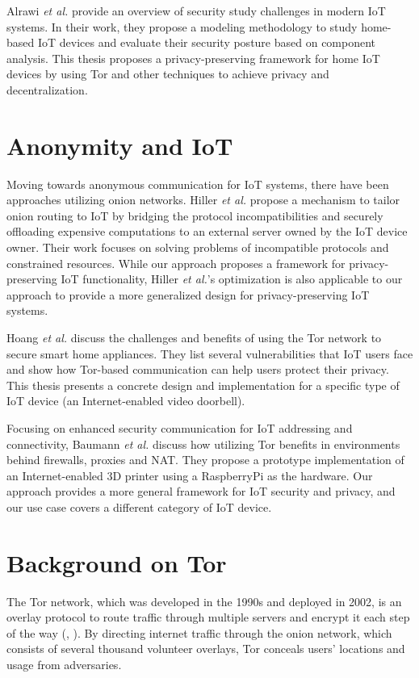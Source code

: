 Alrawi \textit{et al.} \cite{alrawi2019sok} provide an overview of security study challenges in modern IoT systems. In their work, they propose a modeling methodology to study home-based IoT devices and evaluate their security posture based on component analysis. This thesis proposes a privacy-preserving framework for home IoT devices by using Tor and other techniques to achieve privacy and decentralization. 



\section{Anonymity and IoT}

Moving towards anonymous communication for IoT systems, there have been approaches utilizing onion networks. Hiller \textit{et al.} \cite{hiller2019tailoring} propose a mechanism to tailor onion routing to IoT by bridging the protocol incompatibilities and securely offloading expensive computations to an external server owned by the IoT device owner. Their work focuses on solving problems of incompatible protocols and constrained resources. While our approach proposes a framework for privacy-preserving IoT functionality, Hiller \textit{et al.}'s optimization is also applicable to our approach to provide a more generalized design for privacy-preserving IoT systems.

Hoang \textit{et al.} \cite{hoang2015tor} discuss the challenges and benefits of using the Tor network to secure smart home appliances. They list several  vulnerabilities that IoT users face and show how Tor-based communication can help users protect their privacy. This thesis presents a concrete design and implementation for a specific type of IoT device (an Internet-enabled video doorbell).

Focusing on enhanced security communication for IoT addressing and connectivity, Baumann \textit{et al.} \cite{baumann2018utilising} discuss how utilizing Tor benefits in environments behind firewalls, proxies and NAT. They propose a prototype implementation of an Internet-enabled 3D printer using a RaspberryPi as the hardware. Our approach provides a more general framework for IoT security and privacy, and our use case covers a different category of IoT device.

\section{Background on Tor}
\label{sec:torbackground}
The Tor network, which was developed in the 1990s and deployed in 2002, is an overlay protocol to route traffic through multiple servers and encrypt it each step of the way (\cite{torproject}, \cite{chaabane2010digging}). By directing internet traffic through the onion network, which consists of several thousand volunteer overlays, Tor conceals users' locations and usage from adversaries.

